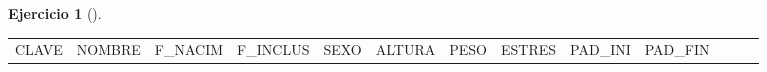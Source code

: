 \documentclass[
  a4paper,
]{scrreport}
\theoremstyle{definition}
\newtheorem{exercise}{Ejercicio}[chapter]
\theoremstyle{remark}
\begin{document}
\begin{exercise}[]
\begin{enumerate}
\begin{tcolorbox}
  \begin{longtable}[]{@{}
    >{\raggedleft\arraybackslash}p{}
    >{\raggedright\arraybackslash}p{}
    >{\raggedright\arraybackslash}p{}
    >{\raggedright\arraybackslash}p{}
    >{\raggedright\arraybackslash}p{}
    >{\raggedleft\arraybackslash}p{}
    >{\raggedleft\arraybackslash}p{}
    >{\raggedleft\arraybackslash}p{}
    >{\raggedleft\arraybackslash}p{}
    >{\raggedleft\arraybackslash}p{}
    >{\raggedleft\arraybackslash}p{}
    >{\raggedleft\arraybackslash}p{}
    >{\raggedright\arraybackslash}p{}@{}}
  \toprule\noalign{}
  \begin{minipage}[b]{\linewidth}\raggedleft
  CLAVE
  \end{minipage} & \begin{minipage}[b]{\linewidth}\raggedright
  NOMBRE
  \end{minipage} & \begin{minipage}[b]{\linewidth}\raggedright
  F\_NACIM
  \end{minipage} & \begin{minipage}[b]{\linewidth}\raggedright
  F\_INCLUS
  \end{minipage} & \begin{minipage}[b]{\linewidth}\raggedright
  SEXO
  \end{minipage} & \begin{minipage}[b]{\linewidth}\raggedleft
  ALTURA
  \end{minipage} & \begin{minipage}[b]{\linewidth}\raggedleft
  PESO
  \end{minipage} & \begin{minipage}[b]{\linewidth}\raggedleft
  ESTRES
  \end{minipage} & \begin{minipage}[b]{\linewidth}\raggedleft
  PAD\_INI
  \end{minipage} & \begin{minipage}[b]{\linewidth}\raggedleft
  PAD\_FIN
  \end{minipage} & \begin{minipage}[b]{\linewidth}\raggedleft

\end{minipage}
\end{longtable}
\end{tcolorbox}
\end{enumerate}
\end{exercise}
\end{document}
